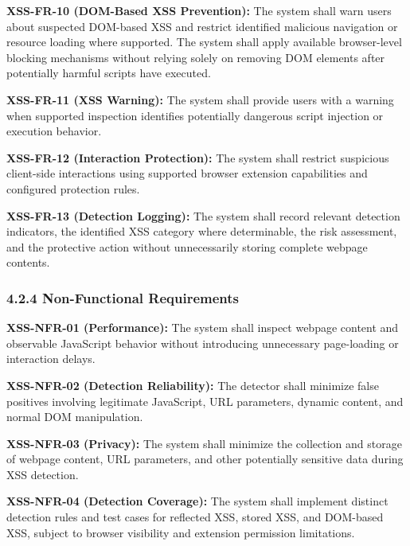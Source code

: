\documentclass[12pt,a4paper]{report}
\begin{document}
\textbf{XSS-FR-10 (DOM-Based XSS Prevention):} The system shall warn users about suspected DOM-based XSS and restrict identified malicious navigation or resource loading where supported. The system shall apply available browser-level blocking mechanisms without relying solely on removing DOM elements after potentially harmful scripts have executed.\par

\textbf{XSS-FR-11 (XSS Warning):} The system shall provide users with a warning when supported inspection identifies potentially dangerous script injection or execution behavior.\par

\textbf{XSS-FR-12 (Interaction Protection):} The system shall restrict suspicious client-side interactions using supported browser extension capabilities and configured protection rules.\par

\textbf{XSS-FR-13 (Detection Logging):} The system shall record relevant detection indicators, the identified XSS category where determinable, the risk assessment, and the protective action without unnecessarily storing complete webpage contents.\par

\subsubsection*{4.2.4 Non-Functional Requirements}

\textbf{XSS-NFR-01 (Performance):} The system shall inspect webpage content and observable JavaScript behavior without introducing unnecessary page-loading or interaction delays.\par

\textbf{XSS-NFR-02 (Detection Reliability):} The detector shall minimize false positives involving legitimate JavaScript, URL parameters, dynamic content, and normal DOM manipulation.\par

\textbf{XSS-NFR-03 (Privacy):} The system shall minimize the collection and storage of webpage content, URL parameters, and other potentially sensitive data during XSS detection.\par

\textbf{XSS-NFR-04 (Detection Coverage):} The system shall implement distinct detection rules and test cases for reflected XSS, stored XSS, and DOM-based XSS, subject to browser visibility and extension permission limitations.\par
\end{document}
